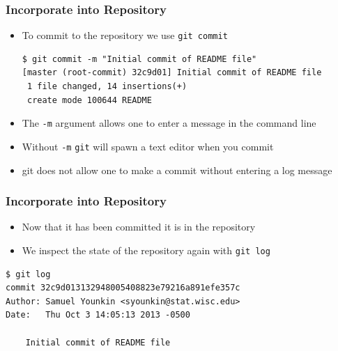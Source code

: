 \documentclass[handout,13pt,compress,c]{beamer}
\newcommand{\bi}{\begin{itemize}}
\newcommand{\ei}{\end{itemize}}
\begin{document}
\begin{frame}[fragile]
\frametitle{Incorporate into Repository}
\bi
\item To commit to the repository we use \texttt{git commit}
\begin{semiverbatim}
\begin{lstlisting}
$ git commit -m "Initial commit of README file"
[master (root-commit) 32c9d01] Initial commit of README file
 1 file changed, 14 insertions(+)
 create mode 100644 README
\end{lstlisting}
\end{semiverbatim}
\item The \texttt{-m} argument allows one to enter a message in the command line
\item Without \texttt{-m} \texttt{git} will spawn a text editor when you commit
\item git does not allow one to make a commit without entering a log message
\ei
\end{frame}
\begin{frame}[fragile]
\frametitle{Incorporate into Repository}
\bi
\item Now that it has been committed it is in the repository 
\item We inspect the state of the repository again with \texttt{git log}
\ei
\begin{semiverbatim}
\begin{lstlisting}
$ git log
commit 32c9d013132948005408823e79216a891efe357c
Author: Samuel Younkin <syounkin@stat.wisc.edu>
Date:   Thu Oct 3 14:05:13 2013 -0500

    Initial commit of README file

\end{lstlisting}
\end{semiverbatim}
\end{frame}
\end{document}
